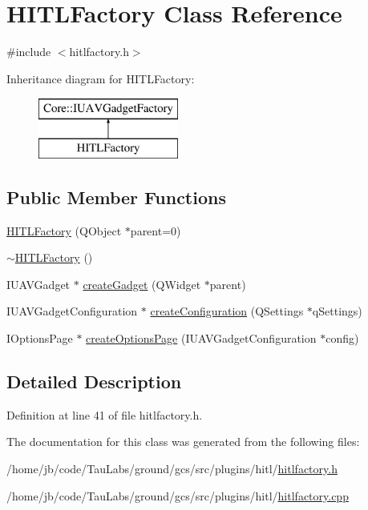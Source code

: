 \hypertarget{class_h_i_t_l_factory}{\section{\-H\-I\-T\-L\-Factory \-Class \-Reference}
\label{class_h_i_t_l_factory}
}


{\ttfamily \#include $<$hitlfactory.\-h$>$}

\-Inheritance diagram for \-H\-I\-T\-L\-Factory\-:\begin{figure}[H]
\begin{center}
\leavevmode
\includegraphics[height=2.000000cm]{class_h_i_t_l_factory}
\end{center}
\end{figure}
\subsection*{\-Public \-Member \-Functions}
\begin{DoxyCompactItemize}
\item 
\hyperlink{group___h_i_t_l_plugin_ga855bda20fa1058c99d4d1aa499fe694e}{\-H\-I\-T\-L\-Factory} (\-Q\-Object $\ast$parent=0)
\item 
\hyperlink{group___h_i_t_l_plugin_ga823205c59cff49942e94bc11bb2c4050}{$\sim$\-H\-I\-T\-L\-Factory} ()
\item 
\-I\-U\-A\-V\-Gadget $\ast$ \hyperlink{group___h_i_t_l_plugin_ga9a06cbbd0b0cd343e48b0386f1ebe45e}{create\-Gadget} (\-Q\-Widget $\ast$parent)
\item 
\-I\-U\-A\-V\-Gadget\-Configuration $\ast$ \hyperlink{group___h_i_t_l_plugin_ga68fed3efae6281089db53d6ea596e331}{create\-Configuration} (\-Q\-Settings $\ast$q\-Settings)
\item 
\-I\-Options\-Page $\ast$ \hyperlink{group___h_i_t_l_plugin_ga3064ddee76385734787a3a04e203bac2}{create\-Options\-Page} (\-I\-U\-A\-V\-Gadget\-Configuration $\ast$config)
\end{DoxyCompactItemize}


\subsection{\-Detailed \-Description}


\-Definition at line 41 of file hitlfactory.\-h.



\-The documentation for this class was generated from the following files\-:\begin{DoxyCompactItemize}
\item 
/home/jb/code/\-Tau\-Labs/ground/gcs/src/plugins/hitl/\hyperlink{hitlfactory_8h}{hitlfactory.\-h}\item 
/home/jb/code/\-Tau\-Labs/ground/gcs/src/plugins/hitl/\hyperlink{hitlfactory_8cpp}{hitlfactory.\-cpp}\end{DoxyCompactItemize}
